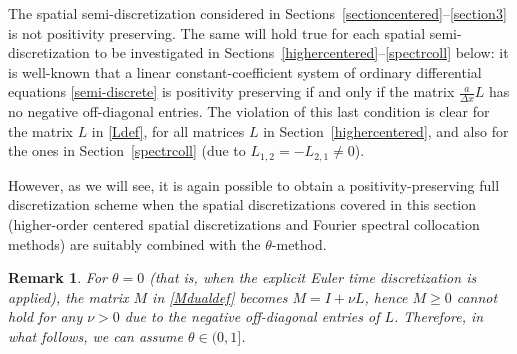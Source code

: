 \documentclass[a4paper]{article}
\newtheorem{remark}{Remark}
\newcommand{\dx}{\Delta x}
\begin{document}
The spatial semi-discretization considered in Sections~\ref{sectioncentered}--\ref{section3} is not positivity preserving. The same will hold true for each spatial semi-discretization to be investigated in Sections~\ref{highercentered}--\ref{spectrcoll} below: it is well-known \cite[Chapter I,
Theorem 7.2]{hundsdorferverwer} that a linear constant-coefficient system of ordinary differential equations 
\eqref{semi-discrete} is positivity preserving if and only if the
matrix $\frac{a}{\dx}L$ has no negative off-diagonal entries. The violation of this last condition is clear for the matrix 
$L$ in \eqref{Ldef}, for all matrices $L$ in Section~\ref{highercentered}, and also for the ones in Section~\ref{spectrcoll} (due to $L_{1,2}=-L_{2,1}\ne 0$).

However, as we will see, it is again possible to obtain a positivity-preserving full discretization scheme when the spatial
discretizations covered in this section (higher-order centered
spatial discretizations and Fourier spectral collocation methods) are suitably combined  with the $\theta$-method.
\begin{remark}
For $\theta=0$ (that is, when the explicit Euler time discretization is applied), the matrix $M$ in
\eqref{Mdualdef} becomes $M = I + \nu L$, hence $M \ge 0$ cannot hold for any $\nu > 0$ due to the
negative off-diagonal entries of $L$.
Therefore, in what follows, we can assume $\theta \in (0,1]$.
\end{remark}

\end{document}
